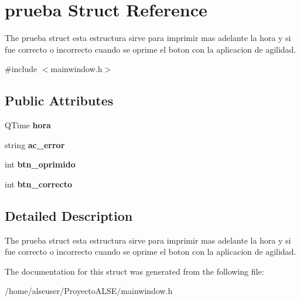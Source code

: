 \hypertarget{structprueba}{}\section{prueba Struct Reference}
\label{structprueba}


The prueba struct esta estructura sirve para imprimir mas adelante la hora y si fue correcto o incorrecto cuando se oprime el boton con la aplicacion de agilidad.  




{\ttfamily \#include $<$mainwindow.\+h$>$}

\subsection*{Public Attributes}
\begin{DoxyCompactItemize}
\item 
\mbox{\label{structprueba_ae8f88919ddb406d91d43046f2b915641}} 
Q\+Time {\bfseries hora}
\item 
\mbox{\label{structprueba_a8f7acf015ffac62b49a88f4b4ea6be54}} 
string {\bfseries ac\+\_\+error}
\item 
\mbox{\label{structprueba_a0b62c24b9e7503d8cfae3a1bd5cb9ccc}} 
int {\bfseries btn\+\_\+oprimido}
\item 
\mbox{\label{structprueba_af1a15a398d4b5cc46ad0dbefe4e3e6c9}} 
int {\bfseries btn\+\_\+correcto}
\end{DoxyCompactItemize}


\subsection{Detailed Description}
The prueba struct esta estructura sirve para imprimir mas adelante la hora y si fue correcto o incorrecto cuando se oprime el boton con la aplicacion de agilidad. 

The documentation for this struct was generated from the following file\+:\begin{DoxyCompactItemize}
\item 
/home/alseuser/\+Proyecto\+A\+L\+S\+E/mainwindow.\+h\end{DoxyCompactItemize}
